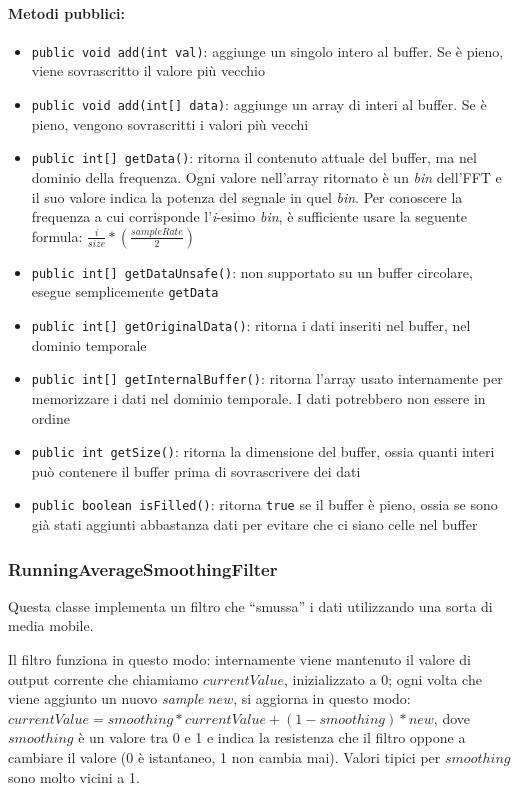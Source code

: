 \paragraph{Metodi pubblici:} \begin{itemize}
	\item \texttt{public void add(int val)}: aggiunge un singolo intero al buffer. Se è pieno, viene sovrascritto il valore più vecchio
	\item \texttt{public void add(int[] data)}: aggiunge un array di interi al buffer. Se è pieno, vengono sovrascritti i valori più vecchi
	\item \texttt{public int[] getData()}: ritorna il contenuto attuale del buffer, ma nel dominio della frequenza. Ogni valore nell'array ritornato è un \textit{bin} dell'FFT e il suo valore indica la potenza del segnale in quel \textit{bin}. Per conoscere la frequenza a cui corrisponde l'\textit{i}-esimo \textit{bin}, è sufficiente usare la seguente formula: ${\frac{i}{size}*(\frac{sampleRate}{2})}$
	\item \texttt{public int[] getDataUnsafe()}: non supportato su un buffer circolare, esegue semplicemente \texttt{getData}
	\item \texttt{public int[] getOriginalData()}: ritorna i dati inseriti nel buffer, nel dominio temporale
	\item \texttt{public int[] getInternalBuffer()}: ritorna l'array usato internamente per memorizzare i dati nel dominio temporale. I dati potrebbero non essere in ordine
	\item \texttt{public int getSize()}: ritorna la dimensione del buffer, ossia quanti interi può contenere il buffer prima di sovrascrivere dei dati
	\item \texttt{public boolean isFilled()}: ritorna \texttt{true} se il buffer è pieno, ossia se sono già stati aggiunti abbastanza dati per evitare che ci siano celle nel buffer
\end{itemize}

\subsubsection{RunningAverageSmoothingFilter}
Questa classe implementa un filtro che ``smussa'' i dati utilizzando una sorta di media mobile.

Il filtro funziona in questo modo: internamente viene mantenuto il valore di output corrente che chiamiamo $currentValue$, inizializzato a 0; ogni volta che viene aggiunto un nuovo \textit{sample} $new$, si aggiorna in questo modo: ${currentValue=smoothing*currentValue+(1-smoothing)*new}$, dove $smoothing$ è un valore tra 0 e 1 e indica la resistenza che il filtro oppone a cambiare il valore (0 è istantaneo, 1 non cambia mai). Valori tipici per $smoothing$ sono molto vicini a 1.

